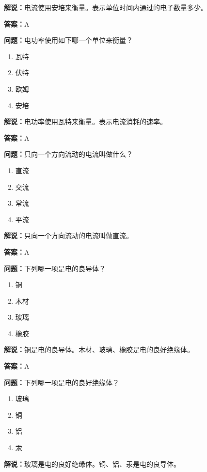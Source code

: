 \documentclass[UTF8]{ctexbook}
\begin{document}
\textbf{解说：}电流使用安培来衡量。表示单位时间内通过的电子数量多少。%

\textbf{答案：}A

\textbf{问题：}电功率使用如下哪一个单位来衡量？

\begin{enumerate}[label=\Alph*), leftmargin=3em]
  \item 瓦特
  \item 伏特
  \item 欧姆
  \item 安培
\end{enumerate}

\textbf{解说：}电功率使用瓦特来衡量。表示电流消耗的速率。

\textbf{答案：}A

\textbf{问题：}只向一个方向流动的电流叫做什么？

\begin{enumerate}[label=\Alph*), leftmargin=3em]
  \item 直流
  \item 交流
  \item 常流
  \item 平流
\end{enumerate}

\textbf{解说：}只向一个方向流动的电流叫做直流。

\textbf{答案：}A

\textbf{问题：}下列哪一项是电的良导体？

\begin{enumerate}[label=\Alph*), leftmargin=3em]
  \item 铜
  \item 木材
  \item 玻璃
  \item 橡胶
\end{enumerate}

\textbf{解说：}铜是电的良导体。木材、玻璃、橡胶是电的良好绝缘体。

\textbf{答案：}A

\textbf{问题：}下列哪一项是电的良好绝缘体？

\begin{enumerate}[label=\Alph*), leftmargin=3em]
  \item 玻璃
  \item 铜
  \item 铝
  \item 汞
\end{enumerate}

\textbf{解说：}玻璃是电的良好绝缘体。铜、铝、汞是电的良导体。
\end{document}
